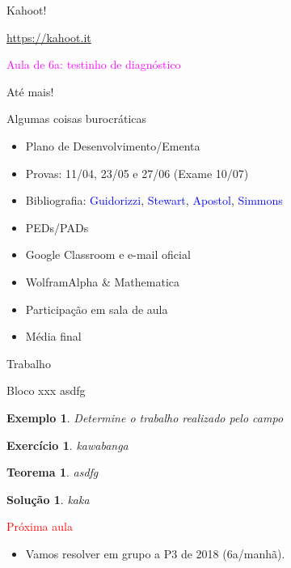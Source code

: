 \documentclass[11pt]{beamer}
\newtheorem{teorema}{Teorema}
\newtheorem{exemplo}{Exemplo}
\newtheorem{exercicio}{Exercício}
\newtheorem{solucao}{Solução}
\begin{document}
\begin{frame}[t]{Kahoot!}

\begin{center}\url{https://kahoot.it}
\end{center}

\pause 
\textcolor{magenta}{Aula de 6a: testinho de diagnóstico} \pause 

\begin{flushright}Até mais!
\end{flushright}
\end{frame}







\begin{frame}[t]{Algumas coisas burocráticas}

\begin{itemize}
\item Plano de Desenvolvimento/Ementa
\item Provas: 11/04, 23/05 e 27/06 (Exame 10/07)
\item Bibliografia: \textcolor{blue}{Guidorizzi}, \textcolor{blue}{Stewart}, \textcolor{blue}{Apostol}, \textcolor{blue}{Simmons}
\item PEDs/PADs
\item Google Classroom e e-mail oficial
\item WolframAlpha \& Mathematica
\item Participação em sala de aula
\item Média final
\end{itemize}

\end{frame}


\begin{frame}[t]{Trabalho}

\begin{block}{Bloco xxx }
asdfg
\end{block}

\begin{exemplo}Determine o trabalho realizado pelo campo 
\end{exemplo}

\begin{exercicio} kawabanga
\end{exercicio}

\begin{teorema}
asdfg
\end{teorema}

\begin{solucao} kaka
\end{solucao}
\end{frame}





\begin{frame}[t]

\textcolor{red}{\large Próxima aula}

\begin{itemize}
\item Vamos resolver em grupo a P3 de 2018 (6a/manhã).
\end{itemize}
\end{frame}
\end{document}
